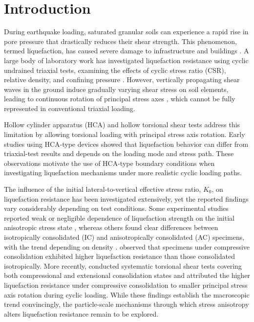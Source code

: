 \documentclass[a4paper,fleqn]{cas-sc}
\newcommand{\Kzero}{\ensuremath{K_0}}
\begin{document}
\maketitle

\section{Introduction}
\label{sec:introduction}

During earthquake loading, saturated granular soils can experience a rapid rise in pore pressure that drastically reduces their shear strength. This phenomenon, termed liquefaction, has caused severe damage to infrastructure and buildings \citep{IshiharaKoga1981,SeedIdriss1967}. A large body of laboratory work has investigated liquefaction resistance using cyclic undrained triaxial tests, examining the effects of cyclic stress ratio (CSR), relative density, and confining pressure \citep{Hyodo1991,SeedLee1966,Silver1976,Toki1986}. However, vertically propagating shear waves in the ground induce gradually varying shear stress on soil elements, leading to continuous rotation of principal stress axes \citep{Arthur1980,IshiharaTowhata1983}, which cannot be fully represented in conventional triaxial loading.

Hollow cylinder apparatus (HCA) and hollow torsional shear tests address this limitation by allowing torsional loading with principal stress axis rotation. Early studies using HCA-type devices \citep[e.g.,][]{IshiharaYasuda1975,Tatsuoka1986,YamashitaToki1993} showed that liquefaction behavior can differ from triaxial-test results and depends on the loading mode and stress path. These observations motivate the use of HCA-type boundary conditions when investigating liquefaction mechanisms under more realistic cyclic loading paths.

The influence of the initial lateral-to-vertical effective stress ratio, \Kzero{}, on liquefaction resistance has been investigated extensively, yet the reported findings vary considerably depending on test conditions. Some experimental studies reported weak or negligible dependence of liquefaction strength on the initial anisotropic stress state \citep[e.g.,][]{IshiharaTakatsu1979,YamashitaToki1993}, whereas others found clear differences between isotropically consolidated (IC) and anisotropically consolidated (AC) specimens, with the trend depending on density \citep{GeorgiannouKonstadinou2014}. \citet{Vargas2020} observed that specimens under compressive consolidation exhibited higher liquefaction resistance than those consolidated isotropically. More recently, \citet{Zhao2024} conducted systematic torsional shear tests covering both compressional and extensional consolidation states and attributed the higher liquefaction resistance under compressive consolidation to smaller principal stress axis rotation during cyclic loading. While these findings establish the macroscopic trend convincingly, the particle-scale mechanisms through which stress anisotropy alters liquefaction resistance remain to be explored.
\end{document}
